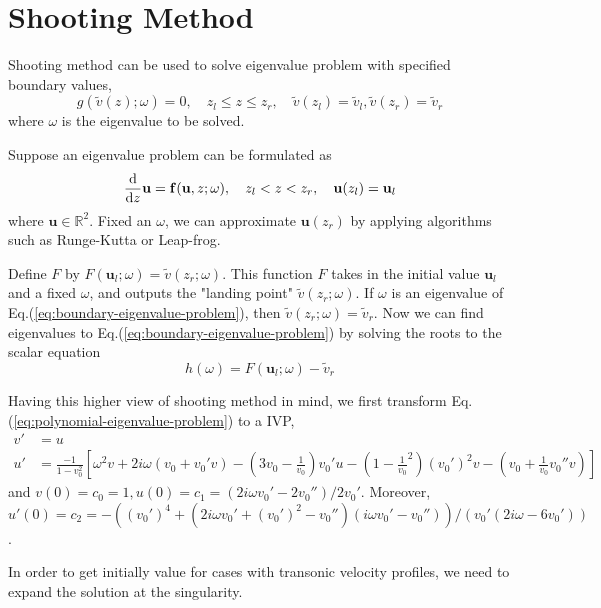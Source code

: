 \section{Shooting Method}
Shooting method can be used to solve eigenvalue problem with specified boundary values,
\begin{equation} \label{eq:boundary-eigenvalue-problem}
	g(\tilde{v}(z);\omega) = 0,
	\quad
	z_l \leq z \leq z_r,
	\quad
	\tilde{v}(z_l) = \tilde{v}_l, \tilde{v}(z_r) = \tilde{v}_r
\end{equation}
where $\omega$ is the eigenvalue to be solved.

Suppose an eigenvalue problem can be formulated as
\[ \dv{z}\mathbf{u} = \mathbf{f}(\mathbf{u},z;\omega),
	\quad
	z_l<z<z_r,
	\quad
	\mathbf{u}(z_l) = \mathbf{u}_l
\]
where $\mathbf{u}\in\mathbb{R}^2$. Fixed an $\omega$, we can approximate $\mathbf{u}(z_r)$ by applying algorithms such as Runge-Kutta or Leap-frog.

Define $F$ by $F(\mathbf{u}_l;\omega)=\tilde{v}(z_r;\omega)$. This function $F$ takes in the initial value $\mathbf{u}_l$ and a fixed $\omega$, and outputs the "landing point" $\tilde{v}(z_r;\omega)$. If $\omega$ is an eigenvalue of Eq.(\ref{eq:boundary-eigenvalue-problem}), then $\tilde{v}(z_r;\omega) = \tilde{v}_r$. Now we can find eigenvalues to Eq.(\ref{eq:boundary-eigenvalue-problem}) by solving the roots to the scalar equation
\[h(\omega) = F(\mathbf{u}_l;\omega) - \tilde{v}_r\]

Having this higher view of shooting method in mind, we first transform Eq.(\ref{eq:polynomial-eigenvalue-problem}) to a IVP,
\begin{align*}
	v' & = u                        \\
	u' & = \frac{-1}{1-v_0^2}\left[
		\omega^2v + 2i\omega(v_0+v_0'v) - \left(3v_0 - \frac{1}{v_0}\right)v_0'u - \left(1-\frac{1}{v_0}^2\right)(v_0')^2v - \left(v_0+\frac{1}{v_0}v_0'' v\right)
		\right]
\end{align*}
and $v(0)=c_0=1,u(0)=c_1=(2i\omega v_0'-2v_0'')/2v_0'$. Moreover, $u'(0)=c_2=-((v_0')^4+(2i\omega v_0' + (v_0')^2 - v_0'')(i\omega v_0' - v_0''))/(v_0'(2i\omega-6v_0'))$.

In order to get initially value for cases with transonic velocity profiles, we need to expand the solution at the singularity.

